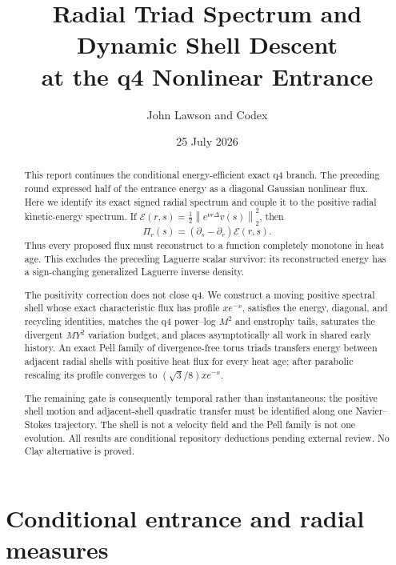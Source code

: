 \documentclass[11pt]{article}
\title{Radial Triad Spectrum and Dynamic Shell Descent\\
at the q4 Nonlinear Entrance}
\author{John Lawson and Codex}
\date{25 July 2026}
\theoremstyle{remark}
\newcommand{\norm}[1]{\left\|#1\right\|}
\begin{document}
\maketitle

\begin{abstract}
This report continues the conditional energy-efficient exact q4 branch.
The preceding round expressed half of the entrance energy as a diagonal
Gaussian nonlinear flux.  Here we identify its exact signed radial
spectrum and couple it to the positive radial kinetic-energy spectrum.
If \(\mathcal E(r,s)=\frac12\norm{e^{\nu r\Delta}v(s)}_2^2\), then
\[
 \Pi_r(s)=(\partial_s-\partial_r)\mathcal E(r,s).
\]
Thus every proposed flux must reconstruct to a function completely
monotone in heat age.  This excludes the preceding Laguerre scalar
survivor: its reconstructed energy has a sign-changing generalized
Laguerre inverse density.

The positivity correction does not close q4.  We construct a moving
positive spectral shell whose exact characteristic flux has profile
\(xe^{-x}\), satisfies the energy, diagonal, and recycling identities,
matches the q4 power--log \(M^2\) and enstrophy tails, saturates the
divergent \(MY^2\) variation budget, and places asymptotically all work
in shared early history.  An exact Pell family of divergence-free torus
triads transfers energy between adjacent radial shells with positive
heat flux for every heat age; after parabolic rescaling its profile
converges to \((\sqrt3/8)xe^{-x}\).

The remaining gate is consequently temporal rather than instantaneous:
the positive shell motion and adjacent-shell quadratic transfer must be
identified along one Navier--Stokes trajectory.  The shell is not a
velocity field and the Pell family is not one evolution.  All results
are conditional repository deductions pending external review.  No Clay
alternative is proved.
\end{abstract}

\section{Conditional entrance and radial measures}
\end{document}
